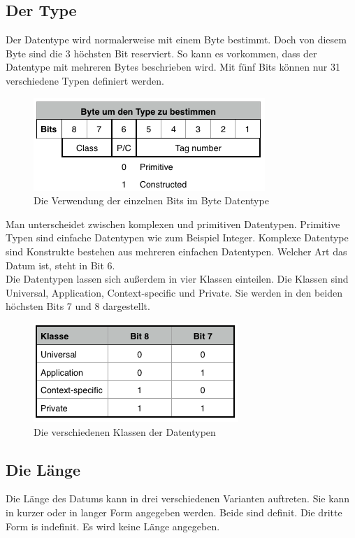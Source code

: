 \documentclass[11pt,a4paper]{article}
\begin{document}
\subsection{Der Type}
Der Datentype wird normalerweise mit einem Byte bestimmt. Doch von diesem Byte sind die 3 höchsten Bit reserviert. So kann es vorkommen, dass der Datentype mit mehreren Bytes beschrieben wird. Mit fünf Bits können nur 31 verschiedene Typen definiert werden.
\\
\begin{figure}[h]
	\centering
	\includegraphics[scale=1]{Bilder/Datentype-BER}
	\caption{Die Verwendung der einzelnen Bits im Byte Datentype}
\end{figure}

Man unterscheidet zwischen komplexen und primitiven Datentypen. Primitive Typen sind einfache Datentypen wie zum Beispiel Integer. Komplexe Datentype sind Konstrukte bestehen aus mehreren einfachen Datentypen. Welcher Art das Datum ist, steht in Bit 6.
\\
Die Datentypen lassen sich außerdem in vier Klassen einteilen. Die Klassen sind Universal, Application, Context-specific und Private. Sie werden in den beiden höchsten Bits 7 und 8 dargestellt.
\\
\begin{figure}[h]
	\centering
	\includegraphics[scale=1]{Bilder/datentypeKlassen}
	\caption{Die verschiedenen Klassen der Datentypen}
\end{figure}

\subsection{Die Länge}
Die Länge des Datums kann in drei verschiedenen Varianten auftreten. Sie kann in kurzer oder in langer Form angegeben werden. Beide sind definit. Die dritte Form is indefinit. Es wird keine Länge angegeben.
\end{document}
